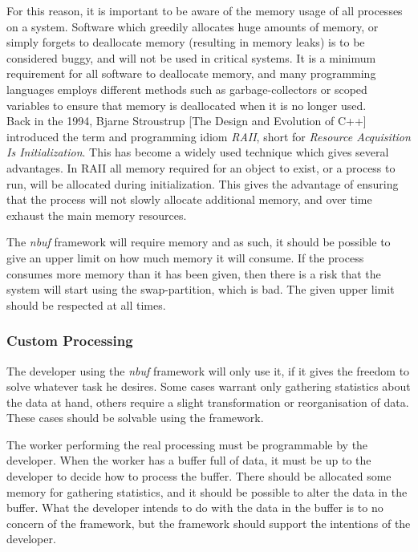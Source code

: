 \documentclass[a4paper]{article}
\newcommand{\nbuf}{\textit{nbuf} }
\begin{document}
For this reason, it is important to be aware of the memory usage of all processes on a system. Software which greedily allocates huge amounts of memory, or simply forgets to deallocate memory (resulting in memory leaks) is to be considered buggy, and will not be used in critical systems. It is a minimum requirement for all software to deallocate memory, and many programming languages employs different methods such as garbage-collectors or scoped variables to ensure that memory is deallocated when it is no longer used.\\


Back in the 1994, Bjarne Stroustrup [The Design and Evolution of C++] introduced the term and programming idiom \textit{RAII}, short for \textit{Resource Acquisition Is Initialization}. This has become a widely used technique which gives several advantages. In RAII all memory required for an object to exist, or a process to run, will be allocated during initialization. This gives the advantage of ensuring that the process will not slowly allocate additional memory, and over time exhaust the main memory resources.

The \nbuf framework will require memory and as such, it should be possible to give an upper limit on how much memory it will consume. If the process consumes more memory than it has been given, then there is a risk that the system will start using the swap-partition, which is bad. The given upper limit should be respected at all times.


\subsubsection{Custom Processing}
The developer using the \nbuf framework will only use it, if it gives the freedom to solve whatever task he desires. Some cases warrant only gathering statistics about the data at hand, others require a slight transformation or reorganisation of data. These cases should be solvable using the framework. 

The worker performing the real processing must be programmable by the developer. When the worker has a buffer full of data, it must be up to the developer to decide how to process the buffer. There should be allocated some memory for gathering statistics, and it should be possible to alter the data in the buffer. What the developer intends to do with the data in the buffer is to no concern of the framework, but the framework should support the intentions of the developer.\\
\end{document}
